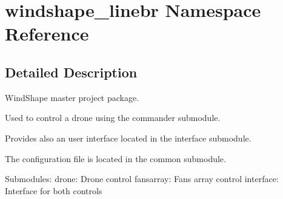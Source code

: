 \hypertarget{namespacewindshape__linebr}{}\section{windshape\+\_\+linebr Namespace Reference}
\label{namespacewindshape__linebr}


\subsection{Detailed Description}
\begin{DoxyVerb}WindShape master project package.

Used to control a drone using the commander submodule.

Provides also an user interface located in the interface submodule.

The configuration file is located in the common submodule.

Submodules:
    drone: Drone control
    fansarray: Fans array control
    interface: Interface for both controls
\end{DoxyVerb}
 